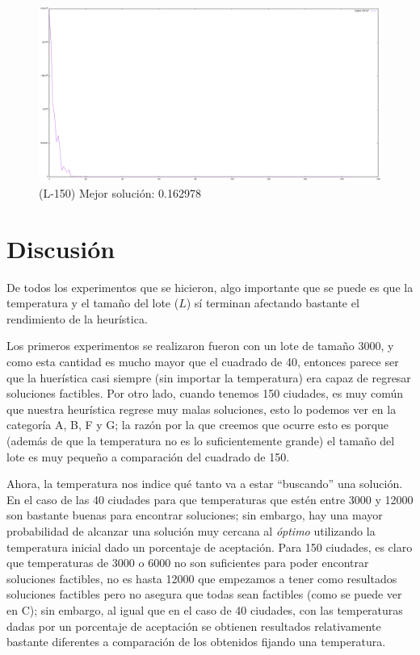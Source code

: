 \documentclass{article}
\newcommand{\tit}[1]{\textit{#1}}
\begin{document}
  \begin{figure}[!h]
    \includegraphics[scale=0.35]{L150}
    \caption{(L-150) Mejor solución: 0.162978} 
  \end{figure}

  \clearpage 

  \section{Discusión} \label{discussion}
  De todos los experimentos que se hicieron, 
  algo importante que se puede es que la temperatura
  y el tamaño del lote ($L$) sí terminan afectando 
  bastante el rendimiento de la heurística. 

  Los primeros experimentos se realizaron fueron con un 
  lote de tamaño 3000, y como esta cantidad es mucho mayor
  que el cuadrado de 40, entonces parece ser que la 
  huerística casi siempre (sin importar la temperatura)
  era capaz de regresar soluciones factibles. Por otro 
  lado, cuando tenemos 150 ciudades, es muy común 
  que nuestra heurística regrese muy malas soluciones, 
  esto lo podemos ver en la categoría A, B, F y G; la 
  razón por la que creemos que ocurre esto es porque 
  (además de que la temperatura no es lo suficientemente
  grande) el tamaño del lote es muy pequeño a comparación
  del cuadrado de 150.

  Ahora, la temperatura nos indice qué tanto va a estar
  ``buscando'' una solución. En el caso de las 40 ciudades
  para que temperaturas que estén entre 3000 y 12000 
  son bastante buenas para encontrar soluciones; sin 
  embargo, hay una mayor probabilidad de alcanzar una 
  solución muy cercana al \tit{óptimo} utilizando la 
  temperatura inicial dado un porcentaje de aceptación.
  Para 150 ciudades, es claro que temperaturas de 
  3000 o 6000 no son suficientes para poder encontrar
  soluciones factibles, no es hasta 12000 que empezamos 
  a tener como resultados soluciones factibles pero no 
  asegura que todas sean factibles (como se 
  puede ver en C); sin embargo, al igual que en el caso de 
  40 ciudades, con las temperaturas dadas por un porcentaje 
  de aceptación se obtienen resultados relativamente 
  bastante diferentes a comparación de los obtenidos 
  fijando una temperatura.
  
\end{document}
